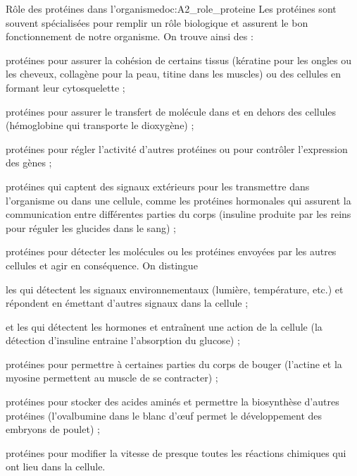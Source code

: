 \begin{doc}{Rôle des protéines dans l'organisme}{doc:A2_role_proteine}
  Les protéines sont souvent spécialisées pour remplir un rôle biologique et assurent le bon fonctionnement de notre organisme.
  On trouve ainsi des :
  \begin{listePoints}
    \item protéines  pour assurer la cohésion de certains tissus (kératine pour les ongles ou les cheveux, collagène pour la peau, titine dans les muscles) ou des cellules en formant leur cytosquelette ;
    \item protéines  pour assurer le transfert de molécule dans et en dehors des cellules (hémoglobine qui transporte le dioxygène) ;
    \item protéines  pour régler l'activité d'autres protéines ou pour contrôler l'expression des gènes ;
    \item protéines  qui captent des signaux extérieurs pour les transmettre dans l'organisme ou dans une cellule, comme les protéines hormonales qui assurent la communication entre différentes parties du corps (insuline produite par les reins pour réguler les glucides dans le sang) ;
    \item protéines  pour détecter les molécules ou les protéines envoyées par les autres cellules et agir en conséquence. On distingue
    \begin{listePoints}
      \item les  qui détectent les signaux environnementaux (lumière, température, etc.) et répondent en émettant d'autres signaux dans la cellule ;
      \item et les  qui détectent les hormones et entraînent une action de la cellule (la détection d'insuline entraine l'absorption du glucose) ;
    \end{listePoints}
    \item protéines  pour permettre à certaines parties du corps de bouger (l'actine et la myosine permettent au muscle de se contracter) ;
    \item protéines  pour stocker des acides aminés et permettre la biosynthèse d'autres protéines (l'ovalbumine dans le blanc d’œuf permet le développement des embryons de poulet) ;
    \item protéines  pour modifier la vitesse de presque toutes les réactions chimiques qui ont lieu dans la cellule.  
  \end{listePoints}
\end{doc}



